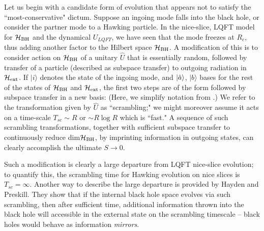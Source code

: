 Let us begin with a candidate form of evolution that appears not to satisfy the ``most-conservative" dictum.  Suppose an ingoing mode falls into the black hole, or consider the partner mode to a Hawking particle.  In the nice-slice, LQFT model for ${{\cal H}_{\rm BH}}$ and the dynamical $U_{LQFT}$, we have seen that the mode freezes at $R_c$, thus adding another factor to the Hilbert space ${{\cal H}_{\rm BH}}$.  A modification of this is to consider action  on ${{\cal H}_{\rm BH}}$ of a unitary ${\hat U}$ that is essentially random, followed by transfer of a particle (described as subspace transfer) to outgoing radiation in ${{\cal H}_{\rm ext}}$.  If $|i\rangle$ denotes the state of the ingoing mode, and $|{\hat a}\rangle$, $|b\rangle$ bases for the rest of the states of ${{\cal H}_{\rm BH}}$ and ${{\cal H}_{\rm ext}}$, the first two steps are of the form
%
\eqn{}
%
followed by subspace transfer in a new basis:
%
\eqn{}
%
(Here, we simplify notation from \subtrans.)  We refer to the transformation given by ${\hat U}$ as ``scrambling;" we might moreover assume it acts on a time-scale $T_{sc}\sim R$ or $\sim R\log R$  which is ``fast."  A sequence of such scrambling transformations, together with sufficient subspace transfer to continuously reduce dim${{\cal H}_{\rm BH}}$, by imprinting information in outgoing states, can clearly accomplish the ultimate $S\rightarrow0$.

Such a modification is clearly a large departure from LQFT nice-slice evolution; to quantify this, the scrambling time for Hawking evolution on nice slices is $T_{sc}=\infty$.  Another way to describe the large departure is provided by Hayden and Preskill\HaPr.  They show that if the internal black hole space evolves via such scrambling, then after sufficient time, additional information thrown into the black hole will accessible in the external state on the scrambling timescale -- black holes would behave as information {\it mirrors}.  

